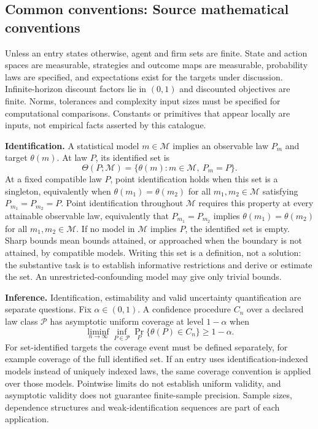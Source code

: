 \documentclass[11pt,a4paper]{article}
\begin{document}
\subsection*{Common conventions: Source mathematical conventions}

Unless an entry states otherwise, agent and firm sets are finite. State and action spaces are measurable, strategies and outcome maps are measurable, probability laws are specified, and expectations exist for the targets under discussion. Infinite-horizon discount factors lie in $(0,1)$ and discounted objectives are finite. Norms, tolerances and complexity input sizes must be specified for computational comparisons. Constants or primitives that appear locally are inputs, not empirical facts asserted by this catalogue.

\textbf{Identification.} A statistical model $m\in\mathcal M$ implies an observable law $P_m$ and target $\theta(m)$. At law $P$, its identified set is
\[
\Theta(P;\mathcal M)=\{\theta(m):m\in\mathcal M,\ P_m=P\}.
\]
At a fixed compatible law $P$, point identification holds when this set is a singleton, equivalently when $\theta(m_1)=\theta(m_2)$ for all $m_1,m_2\in\mathcal M$ satisfying $P_{m_1}=P_{m_2}=P$. Point identification throughout $\mathcal M$ requires this property at every attainable observable law, equivalently that $P_{m_1}=P_{m_2}$ implies $\theta(m_1)=\theta(m_2)$ for all $m_1,m_2\in\mathcal M$. If no model in $\mathcal M$ implies $P$, the identified set is empty. Sharp bounds mean bounds attained, or approached when the boundary is not attained, by compatible models. Writing this set is a definition, not a solution: the substantive task is to establish informative restrictions and derive or estimate the set. An unrestricted-confounding model may give only trivial bounds.

\textbf{Inference.} Identification, estimability and valid uncertainty quantification are separate questions. Fix $\alpha\in(0,1)$. A confidence procedure $C_n$ over a declared law class $\mathcal P$ has asymptotic uniform coverage at level $1-\alpha$ when
\[
\liminf_{n\to\infty}\inf_{P\in\mathcal P}\Pr_P\{\theta(P)\in C_n\}\geq1-\alpha.
\]
For set-identified targets the coverage event must be defined separately, for example coverage of the full identified set. If an entry uses identification-indexed models instead of uniquely indexed laws, the same coverage convention is applied over those models. Pointwise limits do not establish uniform validity, and asymptotic validity does not guarantee finite-sample precision. Sample sizes, dependence structures and weak-identification sequences are part of each application.
\end{document}
